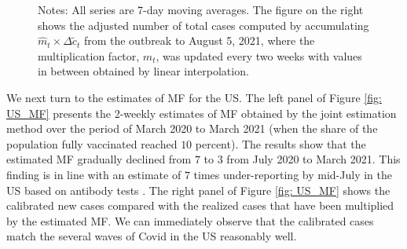 \documentclass[12pt]{article}
\begin{document}
\begin{figure}[tb]
\begin{footnotesize}
%

\vspace{-0.1cm}%
Notes: All series are 7-day moving averages. The figure on the right shows the
adjusted number of total cases computed by accumulating $\hat{m}_{t}%
\times\Delta\tilde{c}_{t}$ from the outbreak to August 5, 2021, where the
multiplication factor, $m_{t}$, was updated every two weeks with values in
between obtained by linear interpolation.%

\end{footnotesize}%
%

\end{figure}%


We next turn to the estimates of MF for the US. The left panel of Figure
\ref{fig: US_MF} presents the 2-weekly estimates of MF obtained by the joint
estimation method over the period of March 2020 to March 2021 (when the share
of the population fully vaccinated reached $10$ percent). The results show
that the estimated MF gradually declined from $7$ to $3$ from July 2020 to
March 2021. This finding is in line with an estimate of $7$ times
under-reporting by mid-July in the US based on antibody tests
\citep{Kalish2021undiagnosed}%
. The right panel of Figure \ref{fig: US_MF} shows the calibrated new cases
compared with the realized cases that have been multiplied by the estimated
MF. We can immediately observe that the calibrated cases match the several
waves of Covid in the US reasonably well.%
\end{document}
